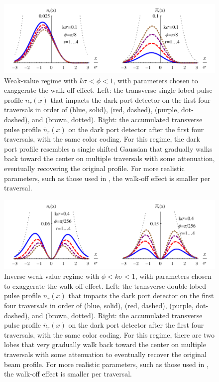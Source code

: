 \begin{figure}[th]
  \begin{center}
    \centerline{\includegraphics[width=6in]{PulsedRecycling/Figures/beam2a.pdf}}
  \end{center}
  \caption[Walk-off effect in recycled weak value measurements.]{Weak-value regime with $k\sigma < \phi < 1$, with parameters chosen to exaggerate the walk-off effect.  Left: the transverse single lobed pulse profile $n_r(x)$ that impacts the dark port detector on the first four traversals in order of (blue, solid), (red, dashed), (purple, dot-dashed), and (brown, dotted).  Right: the accumulated transverse pulse profile $\bar{n}_r(x)$ on the dark port detector after the first four traversals, with the same color coding.  For this regime, the dark port profile resembles a single shifted Gaussian that gradually walks back toward the center on multiple traversals with some attenuation, eventually recovering the original profile.  For more realistic parameters, such as those used in \cite{Dixon2009}, the walk-off effect is smaller per traversal. }
  \label{fig:beam2a}
\end{figure}

\begin{figure}[th]
  \begin{center}
    \centerline{\includegraphics[width=6in]{PulsedRecycling/Figures/beam3a.pdf}}
  \end{center}
  \caption[Walk-off effect in recycled inverse weak value measurements.]{Inverse weak-value regime with $\phi < k\sigma < 1$, with parameters chosen to exaggerate the walk-off effect.  Left: the transverse double-lobed pulse profile $n_r(x)$ that impacts the dark port detector on the first four traversals in order of (blue, solid), (red, dashed), (purple, dot-dashed), and (brown, dotted).  Right: the accumulated transverse pulse profile $\bar{n}_r(x)$ on the dark port detector after the first four traversals, with the same color coding.  For this regime, there are two lobes that very gradually walk back toward the center on multiple traversals with some attenuation to eventually recover the original beam profile.  For more realistic parameters, such as those used in \cite{Starling2010a,Starling2010b}, the walk-off effect is smaller per traversal. }
  \label{fig:beam3a}
\end{figure}

